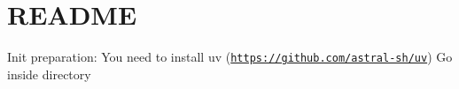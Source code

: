 \chapter{README }
\hypertarget{md__r_e_a_d_m_e}{}\label{md__r_e_a_d_m_e}
Init preparation\+: You need to install uv (\href{https://github.com/astral-sh/uv}{\texttt{https\+://github.\+com/astral-\/sh/uv}}) Go inside directory 
\begin{DoxyCode}{0}

\end{DoxyCode}
 